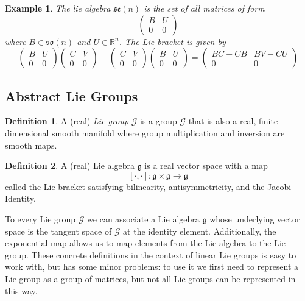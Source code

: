 \documentclass{article}
\newtheorem{example}{Example}[section]
\theoremstyle{remark}
\theoremstyle{definition}
\newtheorem{definition}{Definition}[section]
\begin{document}
\begin{example}
The lie algebra $\mathfrak{se}(n)$ is the set of all matrices of form 
\[\begin{pmatrix}
B & U \\ 0 & 0
\end{pmatrix}\]
where $B \in \mathfrak{so}(n)$ and $U \in \mathbb{R}^n$. The Lie bracket is given by
\[\begin{pmatrix}
B & U \\ 0 & 0
\end{pmatrix} \begin{pmatrix}
C & V \\ 0 & 0
\end{pmatrix} - \begin{pmatrix}
C & V \\ 0 & 0
\end{pmatrix} \begin{pmatrix}
B & U \\ 0 & 0
\end{pmatrix} = \begin{pmatrix}
BC - CB & BV - CU \\ 0 & 0
\end{pmatrix}\]
\end{example}


\subsection{Abstract Lie Groups}

\begin{definition}
A (real) \textit{Lie group} $\mathcal{G}$ is a group $\mathcal{G}$ that is also a real, finite-dimensional smooth manifold where  group multiplication and inversion are smooth maps. 
\end{definition}


\begin{definition}
A (real) Lie algebra $\mathfrak{g}$ is a real vector space with a map 
\[[\cdot, \cdot]: \mathfrak{g} \times \mathfrak{g} \longrightarrow \mathfrak{g}\]
called the Lie bracket satisfying bilinearity, antisymmetricity, and the Jacobi Identity. 
\end{definition}

To every Lie group $\mathcal{G}$ we can associate a Lie algebra $\mathfrak{g}$ whose underlying vector space is the tangent space of $\mathcal{G}$ at the identity element. Additionally, the exponential map allows us to map elements from the Lie algebra to the Lie group. These concrete definitions in the context of linear Lie groups is easy to work with, but has some minor problems: to use it we first need to represent a Lie group as a group of matrices, but not all Lie groups can be represented in this way. 
\end{document}
